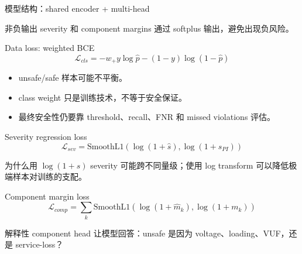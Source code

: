 \documentclass[aspectratio=169,11pt]{beamer}
\begin{document}
\begin{frame}{模型结构：shared encoder + multi-head}
\centering
{}
\vspace{0.2cm}
\begin{block}{非负输出}
severity 和 component margins 通过 softplus 输出，避免出现负风险。
\end{block}
\end{frame}

\begin{frame}{Data loss: weighted BCE}
\[
\mathcal L_{cls}= -w_+y\log\hat p-(1-y)\log(1-\hat p)
\]
\begin{itemize}
  \item unsafe/safe 样本可能不平衡。
  \item class weight 只是训练技术，不等于安全保证。
  \item 最终安全性仍要靠 threshold、recall、FNR 和 missed violations 评估。
\end{itemize}
\end{frame}

\begin{frame}{Severity regression loss}
\[
\mathcal L_{sev}=\mathrm{SmoothL1}\left(\log(1+\hat s),\log(1+s_{PI})\right)
\]
\begin{block}{为什么用 $\log(1+s)$}
severity 可能跨不同量级；使用 log transform 可以降低极端样本对训练的支配。
\end{block}
\end{frame}

\begin{frame}{Component margin loss}
\[
\mathcal L_{comp}=\sum_k \mathrm{SmoothL1}\left(\log(1+\hat m_k),\log(1+m_k)\right)
\]
\begin{block}{解释性}
component head 让模型回答：unsafe 是因为 voltage、loading、VUF，还是 service-loss？
\end{block}
\end{frame}
\end{document}
